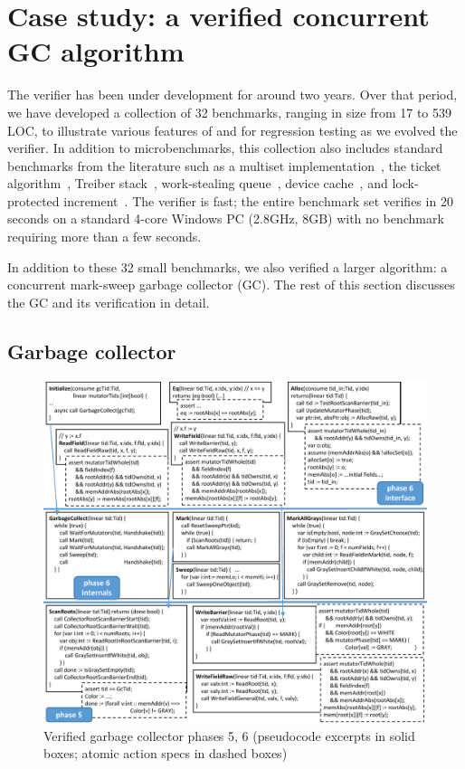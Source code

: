 \section{Case study: a verified concurrent GC algorithm}
\label{sec:experience}

The \civl verifier has been under development for around two years.  
Over that period, we have developed a collection of 32 benchmarks, 
ranging in size from 17 to 539 LOC, to illustrate various features of
\civl and for regression testing as we evolved the verifier.
In addition to microbenchmarks, this collection also includes
standard benchmarks from the literature such as a multiset implementation~\cite{ElmasTQ05}, 
the ticket algorithm~\cite{FarzanKP14}, 
Treiber stack~\cite{Herlihy2008}, work-stealing queue~\cite{Blumofe1999},
device cache~\cite{ElmasQT09}, and lock-protected increment~\cite{FlanaganQ03}. 
The \civl verifier is fast; the entire benchmark set verifies in 20 seconds on a standard 4-core Windows PC (2.8GHz, 8GB)
with no benchmark requiring more than a few seconds.

In addition to these 32 small benchmarks,
we also verified a larger algorithm:
a concurrent mark-sweep garbage collector (GC).
The rest of this section discusses the GC and its verification in detail.

\subsection{Garbage collector}


\begin{figure}
\includegraphics[scale=1.0]{VerifiedGC.pdf}
\caption{Verified garbage collector phases 5, 6 (pseudocode excerpts in solid boxes; atomic action specs in dashed boxes)}
\label{fig:VerifiedGC}
\end{figure}

